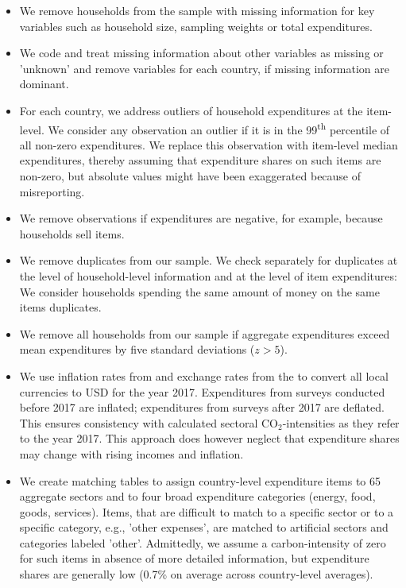 \documentclass[12pt, a4paper]{article}
\begin{document}
\begin{refsection}
\begin{itemize}
    \item We remove households from the sample with missing information for key variables such as household size, sampling weights or total expenditures.
    \item We code and treat missing information about other variables as missing or 'unknown' and remove variables for each country, if missing information are dominant.
    \item For each country, we address outliers of household expenditures at the item-level. We consider any observation an outlier if it is in the 99\textsuperscript{th} percentile of all non-zero expenditures. We replace this observation with item-level median expenditures, thereby assuming that expenditure shares on such items are non-zero, but absolute values might have been exaggerated because of misreporting.
    \item We remove observations if expenditures are negative, for example, because households sell items.
    \item We remove duplicates from our sample. We check separately for duplicates at the level of household-level information and at the level of item expenditures: We consider households spending the same amount of money on the same items duplicates.
    \item We remove all households from our sample if aggregate expenditures exceed mean expenditures by five standard deviations ($z>5$).
    \item We use inflation rates from \textcite{IMF.2020} and exchange rates from the \textcite{WorldBankGroup.2023} to convert all local currencies to USD for the year 2017. Expenditures from surveys conducted before 2017 are inflated; expenditures from surveys after 2017 are deflated. This ensures consistency with calculated sectoral CO$_{2}$-intensities as they refer to the year 2017. This approach does however neglect that expenditure shares may change with rising incomes and inflation.
    \item We create matching tables to assign country-level expenditure items to 65 aggregate sectors and to four broad expenditure categories (energy, food, goods, services). Items, that are difficult to match to a specific sector or to a specific category, e.g., 'other expenses', are matched to artificial sectors and categories labeled 'other'. Admittedly, we assume a carbon-intensity of zero for such items in absence of more detailed information, but expenditure shares are generally low (0.7\% on average across country-level averages). 

\end{itemize}
\end{refsection}
\end{document}
